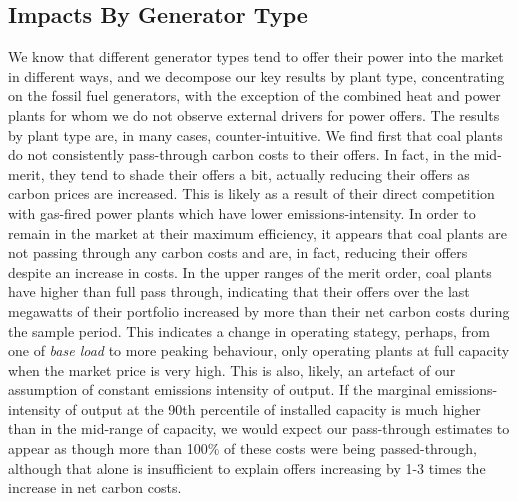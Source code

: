 \documentclass[12pt]{article}
\begin{document}
\subsection{Impacts By Generator Type}
We know that different generator types tend to offer their power into the market in different ways, and we decompose our key results by plant type, concentrating on the fossil fuel generators, with the exception of the combined heat and power plants for whom we do not observe external drivers for power offers. The results by plant type are, in many cases, counter-intuitive. We find first that coal plants do not consistently pass-through carbon costs to their offers. In fact, in the mid-merit, they tend to shade their offers a bit, actually reducing their offers as carbon prices are increased. This is likely as a result of their direct competition with gas-fired power plants which have lower emissions-intensity. In order to remain in the market at their maximum efficiency, it appears that coal plants are not passing through any carbon costs and are, in fact, reducing their offers despite an increase in costs. In the upper ranges of the merit order, coal plants have higher than full pass through, indicating that their offers over the last megawatts of their portfolio increased by more than their net carbon costs during the sample period. This indicates a change in operating stategy, perhaps, from one of \textit{base load} to more peaking behaviour, only operating plants at full capacity when the market price is very high. This is also, likely, an artefact of our assumption of constant emissions intensity of output. If the marginal emissions-intensity of output at the 90th percentile of installed capacity is much higher than in the mid-range of capacity, we would expect our pass-through estimates to appear as though more than 100\% of these costs were being passed-through, although that alone is insufficient to explain offers increasing by 1-3 times the increase in net carbon costs.
\end{document}
